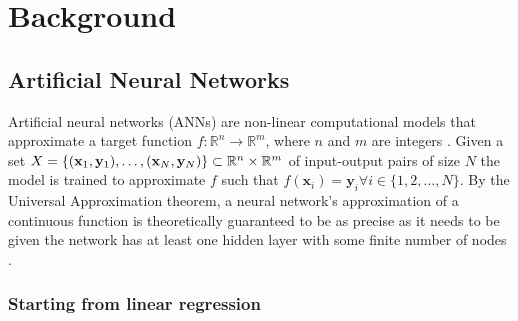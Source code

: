 \chapter{Background}
\label{ch1}

\minitoc 

\section{Artificial Neural Networks}
Artificial neural networks (ANNs) are non-linear computational models that approximate 
a target function   $f: \mathbb{R}^n \rightarrow \mathbb{R}^m$, where $n$ and $m$ are 
integers \cite{Bis:06}. Given a set $X = \{ (\mathbf{x}_1, \mathbf{y}_1), \ldots, (\mathbf{x}_N,
 \mathbf{y}_N) \} \subset \mathbb R^n \times \mathbb R^m$ of input-output pairs of size $N$ the model is 
 trained to approximate $f$ such that $f(\mathbf{x}_i) = \mathbf{y}_i \forall i \in \{1, 2, 
 \ldots, N\}$. By the Universal Approximation theorem, a neural network's approximation of a 
 continuous function is theoretically guaranteed to be as precise as it needs to be given the 
 network has at least one hidden layer with some finite number of nodes \cite{HorStiWhi:89}. 

\subsection{Starting from linear regression}

